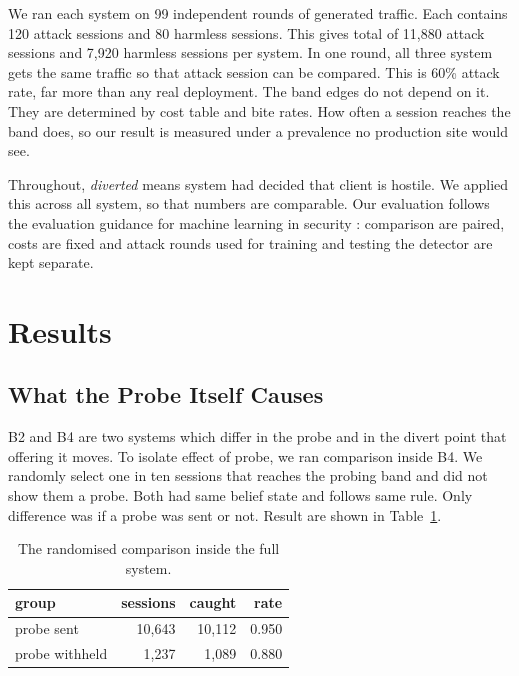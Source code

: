 \documentclass[runningheads]{llncs}
\begin{document}
We ran each system on 99 independent rounds of generated traffic. Each contains 120 attack sessions and 80 harmless sessions. This gives total of 11{,}880 attack sessions and 7{,}920 harmless sessions per system. In one round, all three system gets the same traffic so that attack session can be compared. This is 60\% attack rate, far more than any real deployment. The band edges do not depend on it. They are determined by cost table and bite rates. How often a session reaches the band does, so our result is measured under a prevalence no production site would see.



Throughout, \emph{diverted} means system had decided that client is hostile. We applied this across all system, so that numbers are comparable. Our evaluation follows the evaluation guidance for machine learning in security \cite{arp2022dos,sommer2010outside}: comparison are paired, costs are fixed and attack rounds used for training and testing the detector are kept separate.

\section{Results}
\label{sec:results}

\subsection{What the Probe Itself Causes}
B2 and B4 are two systems which differ in the probe and in the divert point that offering it moves. To isolate effect of probe, we ran comparison inside B4. We randomly select one in ten sessions that reaches the probing band and did not show them a probe. Both had same belief state and follows same rule. Only difference was if a probe was sent or not. Result are shown in Table~\ref{tab:holdout}.

\begin{table}[t]
\centering
\caption{The randomised comparison inside the full system.}
\label{tab:holdout}
\begin{tabular}{@{}lrrr@{}}
\toprule
group & sessions & caught & rate \\
\midrule
probe sent      & 10{,}643 & 10{,}112 & 0.950 \\
probe withheld  & 1{,}237  & 1{,}089  & 0.880 \\
\bottomrule
\end{tabular}
\end{table}
\end{document}
